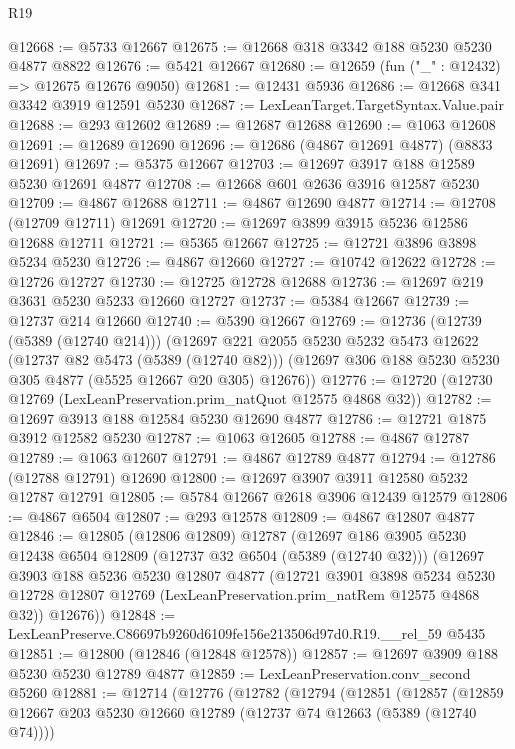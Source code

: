 \begin{lexlean}{R19}
\begin{coremodule}
@12668 := @5733 @12667
@12675 := @12668 @318 @3342 @188 @5230 @5230 @4877 @8822
@12676 := @5421 @12667
@12680 := @12659 (fun ("_" : @12432) => @12675 @12676 @9050)
@12681 := @12431 @5936
@12686 := @12668 @341 @3342 @3919 @12591 @5230
@12687 := LexLeanTarget.TargetSyntax.Value.pair
@12688 := @293 @12602
@12689 := @12687 @12688
@12690 := @1063 @12608
@12691 := @12689 @12690
@12696 := @12686 (@4867 @12691 @4877) (@8833 @12691)
@12697 := @5375 @12667
@12703 := @12697 @3917 @188 @12589 @5230 @12691 @4877
@12708 := @12668 @601 @2636 @3916 @12587 @5230
@12709 := @4867 @12688
@12711 := @4867 @12690 @4877
@12714 := @12708 (@12709 @12711) @12691
@12720 := @12697 @3899 @3915 @5236 @12586 @12688 @12711
@12721 := @5365 @12667
@12725 := @12721 @3896 @3898 @5234 @5230
@12726 := @4867 @12660
@12727 := @10742 @12622
@12728 := @12726 @12727
@12730 := @12725 @12728 @12688
@12736 := @12697 @219 @3631 @5230 @5233 @12660 @12727
@12737 := @5384 @12667
@12739 := @12737 @214 @12660
@12740 := @5390 @12667
@12769 := @12736
    (@12739 (@5389 (@12740 @214)))
    (@12697
      @221
      @2055
      @5230
      @5232
      @5473
      @12622
      (@12737 @82 @5473 (@5389 (@12740 @82)))
      (@12697 @306 @188 @5230 @5230 @305 @4877 (@5525 @12667 @20 @305) @12676))
@12776 := @12720 (@12730 @12769 (LexLeanPreservation.prim_natQuot @12575 @4868 @32))
@12782 := @12697 @3913 @188 @12584 @5230 @12690 @4877
@12786 := @12721 @1875 @3912 @12582 @5230
@12787 := @1063 @12605
@12788 := @4867 @12787
@12789 := @1063 @12607
@12791 := @4867 @12789 @4877
@12794 := @12786 (@12788 @12791) @12690
@12800 := @12697 @3907 @3911 @12580 @5232 @12787 @12791
@12805 := @5784 @12667 @2618 @3906 @12439 @12579
@12806 := @4867 @6504
@12807 := @293 @12578
@12809 := @4867 @12807 @4877
@12846 := @12805
    (@12806 @12809)
    @12787
    (@12697
      @186
      @3905
      @5230
      @12438
      @6504
      @12809
      (@12737 @32 @6504 (@5389 (@12740 @32)))
      (@12697
        @3903
        @188
        @5236
        @5230
        @12807
        @4877
        (@12721
          @3901
          @3898
          @5234
          @5230
          @12728
          @12807
          @12769
          (LexLeanPreservation.prim_natRem @12575 @4868 @32))
        @12676))
@12848 := LexLeanPreserve.C86697b9260d6109fe156e213506d97d0.R19.__rel_59 @5435
@12851 := @12800 (@12846 (@12848 @12578))
@12857 := @12697 @3909 @188 @5230 @5230 @12789 @4877
@12859 := LexLeanPreservation.conv_second @5260
@12881 := @12714
    (@12776
      (@12782
        (@12794
          (@12851
            (@12857
              (@12859 @12667 @203 @5230 @12660 @12789 (@12737 @74 @12663 (@5389 (@12740 @74))))

\end{coremodule}
\end{lexlean}
